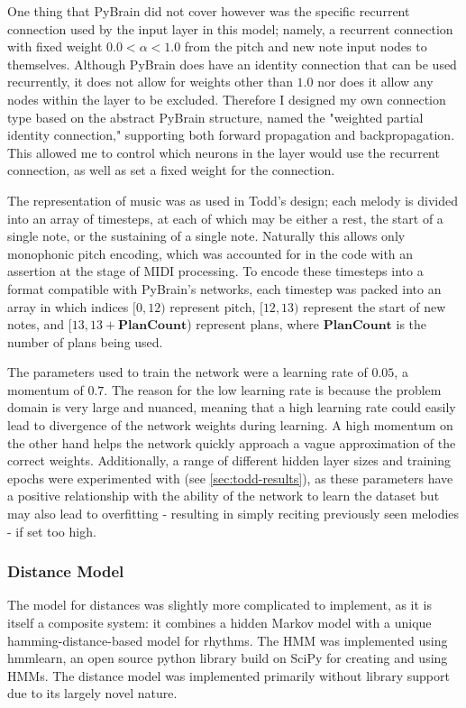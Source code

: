 \documentclass[ author={Stephen Livermore-Tozer},
				supervisor={Dr. Peter Flach},
				degree={MEng},
				title={Performing Algorithmic Co-composition Using Machine Learning},
				subtitle={},
				type={research},
				year={2016} ]{dissertation}
\begin{document}
	One thing that PyBrain did not cover however was the specific recurrent connection used by the input layer in this model; namely, a recurrent connection with fixed weight $0.0 < \alpha < 1.0$ from the pitch and new note input nodes to themselves. Although PyBrain does have an identity connection that can be used recurrently, it does not allow for weights other than $1.0$ nor does it allow any nodes within the layer to be excluded. Therefore I designed my own connection type based on the abstract PyBrain structure, named the "weighted partial identity connection," supporting both forward propagation and backpropagation. This allowed me to control which neurons in the layer would use the recurrent connection, as well as set a fixed weight for the connection.
	
	The representation of music was as used in Todd's design; each melody is divided into an array of timesteps, at each of which may be either a rest, the start of a single note, or the sustaining of a single note. Naturally this allows only monophonic pitch encoding, which was accounted for in the code with an assertion at the stage of MIDI processing. To encode these timesteps into a format compatible with PyBrain's networks, each timestep was packed into an array in which indices $[0,12)$ represent pitch, $[12,13)$ represent the start of new notes, and $[13,13+\mathbf{PlanCount}$) represent plans, where $\mathbf{PlanCount}$ is the number of plans being used.
	
	The parameters used to train the network were a learning rate of $0.05$, a momentum of $0.7$. The reason for the low learning rate is because the problem domain is very large and nuanced, meaning that a high learning rate could easily lead to divergence of the network weights during learning. A high momentum on the other hand helps the network quickly approach a vague approximation of the correct weights. Additionally, a range of different hidden layer sizes and training epochs were experimented with (see \ref{sec:todd-results}), as these parameters have a positive relationship with the ability of the network to learn the dataset but may also lead to overfitting - resulting in simply reciting previously seen melodies - if set too high.
	
	\subsubsection{Distance Model}
	
	The model for distances was slightly more complicated to implement, as it is itself a composite system: it combines a hidden Markov model with a unique hamming-distance-based model for rhythms. The HMM was implemented using hmmlearn, an open source python library build on SciPy for creating and using HMMs. The distance model was implemented primarily without library support due to its largely novel nature. 
	
\end{document}
